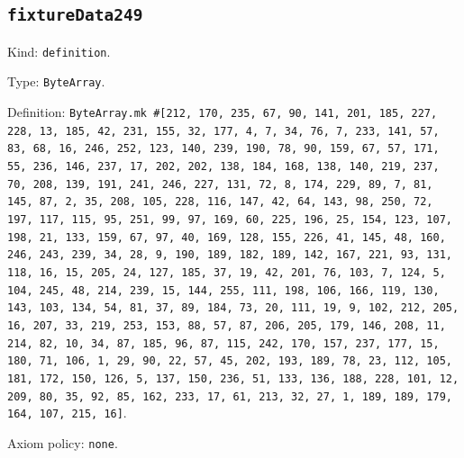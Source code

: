 \documentclass[11pt]{article}
\begin{document}
\subsection*{\texttt{fixtureData249}}
\noindent Kind: \texttt{definition}.\par
\noindent Type: \texttt{ByteArray}.\par
\noindent Definition: \texttt{ByteArray.mk \#[212, 170, 235, 67, 90, 141, 201, 185, 227, 228, 13, 185, 42, 231, 155, 32, 177, 4, 7, 34, 76, 7, 233, 141, 57, 83, 68, 16, 246, 252, 123, 140, 239, 190, 78, 90, 159, 67, 57, 171, 55, 236, 146, 237, 17, 202, 202, 138, 184, 168, 138, 140, 219, 237, 70, 208, 139, 191, 241, 246, 227, 131, 72, 8, 174, 229, 89, 7, 81, 145, 87, 2, 35, 208, 105, 228, 116, 147, 42, 64, 143, 98, 250, 72, 197, 117, 115, 95, 251, 99, 97, 169, 60, 225, 196, 25, 154, 123, 107, 198, 21, 133, 159, 67, 97, 40, 169, 128, 155, 226, 41, 145, 48, 160, 246, 243, 239, 34, 28, 9, 190, 189, 182, 189, 142, 167, 221, 93, 131, 118, 16, 15, 205, 24, 127, 185, 37, 19, 42, 201, 76, 103, 7, 124, 5, 104, 245, 48, 214, 239, 15, 144, 255, 111, 198, 106, 166, 119, 130, 143, 103, 134, 54, 81, 37, 89, 184, 73, 20, 111, 19, 9, 102, 212, 205, 16, 207, 33, 219, 253, 153, 88, 57, 87, 206, 205, 179, 146, 208, 11, 214, 82, 10, 34, 87, 185, 96, 87, 115, 242, 170, 157, 237, 177, 15, 180, 71, 106, 1, 29, 90, 22, 57, 45, 202, 193, 189, 78, 23, 112, 105, 181, 172, 150, 126, 5, 137, 150, 236, 51, 133, 136, 188, 228, 101, 12, 209, 80, 35, 92, 85, 162, 233, 17, 61, 213, 32, 27, 1, 189, 189, 179, 164, 107, 215, 16]}.\par
\noindent Axiom policy: \texttt{none}.\par
\end{document}
